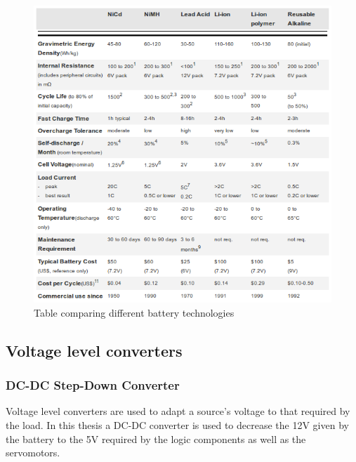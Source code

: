 		\begin{figure}[H]
				\centering
				\includegraphics[scale=0.75]{images/ProjectComponents/battery-differences.png}
				\caption{Table comparing different battery technologies}
				\label{}
		\end{figure}
		\bigskip











\newpage
\subsection{Voltage level converters}	
	\subsubsection{DC-DC Step-Down Converter}

		Voltage level converters are used to adapt a source's voltage to that required by the load. In this thesis a DC-DC converter is used to decrease the 12V given by the battery to the 5V required by the logic components as well as the servomotors. \\
		
